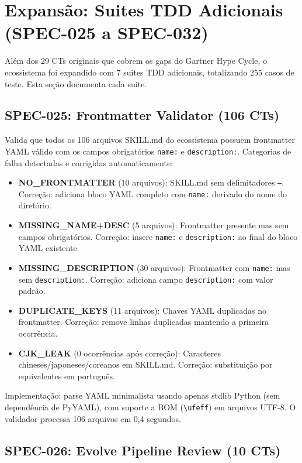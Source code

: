 \section{Expansão: Suites TDD Adicionais (SPEC-025 a SPEC-032)}

Além dos 29 CTs originais que cobrem os gaps do Gartner Hype Cycle, o ecossistema foi expandido com 7 suites TDD adicionais, totalizando 255 casos de teste. Esta seção documenta cada suite.

\subsection{SPEC-025: Frontmatter Validator (106 CTs)}

Valida que todos os 106 arquivos SKILL.md do ecossistema possuem frontmatter YAML válido com os campos obrigatórios \texttt{name:} e \texttt{description:}. Categorias de falha detectadas e corrigidas automaticamente:

\begin{itemize}
  \item \textbf{NO\_FRONTMATTER} (10 arquivos): SKILL.md sem delimitadores \texttt{---}. Correção: adiciona bloco YAML completo com \texttt{name:} derivado do nome do diretório.
  \item \textbf{MISSING\_NAME+DESC} (5 arquivos): Frontmatter presente mas sem campos obrigatórios. Correção: insere \texttt{name:} e \texttt{description:} ao final do bloco YAML existente.
  \item \textbf{MISSING\_DESCRIPTION} (30 arquivos): Frontmatter com \texttt{name:} mas sem \texttt{description:}. Correção: adiciona campo \texttt{description:} com valor padrão.
  \item \textbf{DUPLICATE\_KEYS} (11 arquivos): Chaves YAML duplicadas no frontmatter. Correção: remove linhas duplicadas mantendo a primeira ocorrência.
  \item \textbf{CJK\_LEAK} (0 ocorrências após correção): Caracteres chineses/japoneses/coreanos em SKILL.md. Correção: substituição por equivalentes em português.
\end{itemize}

Implementação: parse YAML minimalista usando apenas stdlib Python (sem dependência de PyYAML), com suporte a BOM (\texttt{\textbackslash ufeff}) em arquivos UTF-8. O validador processa 106 arquivos em 0,4 segundos.

\subsection{SPEC-026: Evolve Pipeline Review (10 CTs)}

